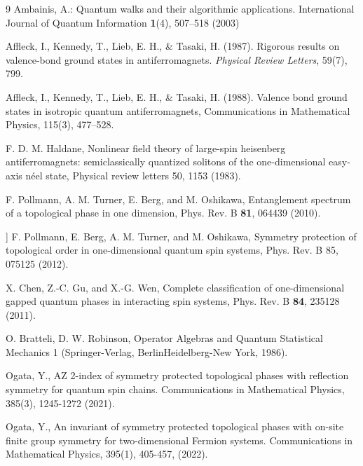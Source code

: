 \documentclass[12pt,a4paper]{article}
\begin{document}
\begin{thebibliography}{9}
Ambainis, A.: Quantum walks and their algorithmic applications. International Journal of Quantum Information \textbf{1}(4), 507--518 (2003)

 Affleck, I., Kennedy, T., Lieb, E. H., \& Tasaki, H. (1987). Rigorous results on valence-bond ground states in antiferromagnets. \textit{Physical Review Letters}, 59(7), 799.

 Affleck, I., Kennedy, T., Lieb, E. H., \& Tasaki, H. (1988). Valence bond ground states in isotropic quantum antiferromagnets, Communications in Mathematical Physics, 115(3), 477–528.


 F. D. M. Haldane, Nonlinear field theory of large-spin heisenberg antiferromagnets: semiclassically quantized solitons of the
one-dimensional easy-axis néel state, Physical review letters 50, 1153 (1983).



 F. Pollmann, A. M. Turner, E. Berg, and M. Oshikawa,  Entanglement spectrum of a topological phase in one dimension, Phys. Rev. B \textbf{81}, 064439 (2010).

 ] F. Pollmann, E. Berg, A. M. Turner, and M. Oshikawa,
Symmetry protection of topological order in one-dimensional quantum spin systems, Phys. Rev. B 85,
075125 (2012).




 X. Chen, Z.-C. Gu, and X.-G. Wen,  Complete classification of one-dimensional gapped quantum phases in interacting spin systems, Phys. Rev. B \textbf{84}, 235128 (2011).

 O. Bratteli, D. W. Robinson, Operator Algebras and Quantum Statistical Mechanics 1 (Springer-Verlag, BerlinHeidelberg-New York, 1986).


 Ogata, Y.,  AZ 2-index of symmetry protected topological phases with reflection symmetry for quantum spin chains. Communications in Mathematical Physics, 385(3), 1245-1272 (2021).

 Ogata, Y., An invariant of symmetry protected topological phases with on-site finite group symmetry for two-dimensional Fermion systems. Communications in Mathematical Physics, 395(1), 405-457, (2022).


\end{thebibliography}
\end{document}
